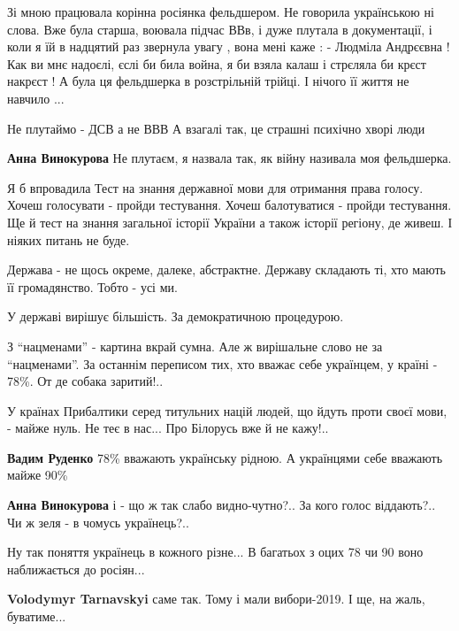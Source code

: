\begin{itemize}
Зі мною працювала корінна росіянка фельдшером. Не говорила українською ні слова.
Вже була старша, воювала підчас ВВв, і дуже плутала в документації, і коли я їй в надцятий раз звернула увагу , вона мені каже :
- Людміла Андрєєвна !
Как ви мнє надоєлі, єслі би била война, я би взяла калаш і стрєляла би крєст накрєст !
А була ця фельдшерка в розстрільній трійці.
І нічого її життя не навчило ...

\begin{itemize} %
Не плутаймо - ДСВ а не ВВВ
А взагалі так, це страшні психічно хворі люди

\textbf{Анна Винокурова}
Не плутаєм, я назвала так, як війну називала моя фельдшерка.
\end{itemize} %


Я б впровадила Тест на знання державної мови для отримання права голосу. Хочеш
голосувати - пройди тестування. Хочеш балотуватися - пройди тестування. Ще й
тест на знання загальної історії України а також історії регіону, де живеш. І
ніяких питань не буде.


Держава - не щось окреме, далеке, абстрактне. Державу складають ті, хто мають
її громадянство. Тобто - усі ми.

У державі вирішує більшість. За демократичною процедурою.

З \enquote{нацменами} - картина вкрай сумна. Але ж вирішальне слово не за \enquote{нацменами}.
За останнім переписом тих, хто вважає себе українцем, у країні - 78\%. От де
собака заритий!..

У країнах Прибалтики серед титульних націй людей, що йдуть проти своєї мови, -
майже нуль. Не теє в нас... Про Білорусь вже й не кажу!..

\begin{itemize} %
\textbf{Вадим Руденко} 78\% вважають українську рідною. А українцями себе вважають майже 90\%

\textbf{Анна Винокурова} і - що ж так слабо видно-чутно?..
За кого голос віддають?..
Чи ж зеля - в чомусь українець?..

Ну так поняття українець в кожного різне... В багатьох з оцих 78 чи 90 воно наближається до росіян...

\textbf{Volodymyr Tarnavskyi} саме так. Тому і мали вибори-2019. І ще, на жаль, буватиме...


\end{itemize}
\end{itemize}
